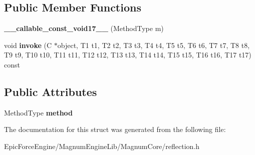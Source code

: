\subsection*{Public Member Functions}
\begin{DoxyCompactItemize}
\item 
{\bfseries \+\_\+\+\_\+callable\+\_\+const\+\_\+void17\+\_\+\+\_\+} (Method\+Type m)\hypertarget{structagm_1_1reflection_1_1____callable__const__void17_____aac52a8280944ba9177aa4a7872265374}{}\label{structagm_1_1reflection_1_1____callable__const__void17_____aac52a8280944ba9177aa4a7872265374}

\item 
void {\bfseries invoke} (C $\ast$object, T1 t1, T2 t2, T3 t3, T4 t4, T5 t5, T6 t6, T7 t7, T8 t8, T9 t9, T10 t10, T11 t11, T12 t12, T13 t13, T14 t14, T15 t15, T16 t16, T17 t17) const \hypertarget{structagm_1_1reflection_1_1____callable__const__void17_____a8becfbe66e5ada6663bff15d4bc68bd1}{}\label{structagm_1_1reflection_1_1____callable__const__void17_____a8becfbe66e5ada6663bff15d4bc68bd1}

\end{DoxyCompactItemize}
\subsection*{Public Attributes}
\begin{DoxyCompactItemize}
\item 
Method\+Type {\bfseries method}\hypertarget{structagm_1_1reflection_1_1____callable__const__void17_____afe2e5408d4fc2c0f82d7aa4fba438f43}{}\label{structagm_1_1reflection_1_1____callable__const__void17_____afe2e5408d4fc2c0f82d7aa4fba438f43}

\end{DoxyCompactItemize}


The documentation for this struct was generated from the following file\+:\begin{DoxyCompactItemize}
\item 
Epic\+Force\+Engine/\+Magnum\+Engine\+Lib/\+Magnum\+Core/reflection.\+h\end{DoxyCompactItemize}
